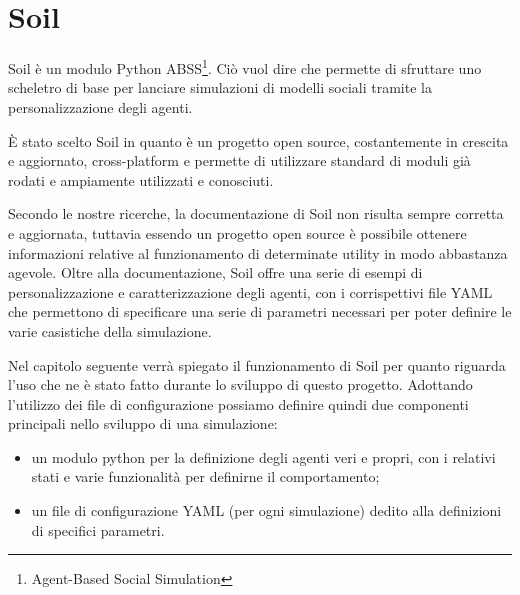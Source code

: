 \section{Soil}
    Soil è un modulo Python ABSS\footnote{Agent-Based Social Simulation}. Ciò vuol dire che permette di sfruttare uno scheletro di base per lanciare simulazioni di modelli sociali tramite la personalizzazione degli agenti.
    
    È stato scelto Soil in quanto è un progetto open source, costantemente in crescita e aggiornato, cross-platform e permette di utilizzare standard di moduli già rodati e ampiamente utilizzati e conosciuti.
    
    Secondo le nostre ricerche, la documentazione di Soil non risulta sempre corretta e aggiornata, tuttavia essendo un progetto open source è possibile ottenere informazioni relative al funzionamento di determinate utility in modo abbastanza agevole.
    Oltre alla documentazione, Soil offre una serie di esempi di personalizzazione e caratterizzazione degli agenti, con i corrispettivi file YAML che permettono di specificare una serie di parametri necessari per poter definire le varie casistiche della simulazione.
    
    Nel capitolo seguente verrà spiegato il funzionamento di Soil per quanto riguarda l’uso che ne è stato fatto durante lo sviluppo di questo progetto. Adottando l'utilizzo dei file di configurazione possiamo definire quindi due componenti principali nello sviluppo di una simulazione:
    
    \begin{itemize}
        \item un modulo python per la definizione degli agenti veri e propri, con i relativi stati e varie funzionalità per definirne il comportamento;
        \item un file di configurazione YAML (per ogni simulazione) dedito alla definizioni di specifici parametri.
    \end{itemize}
    
